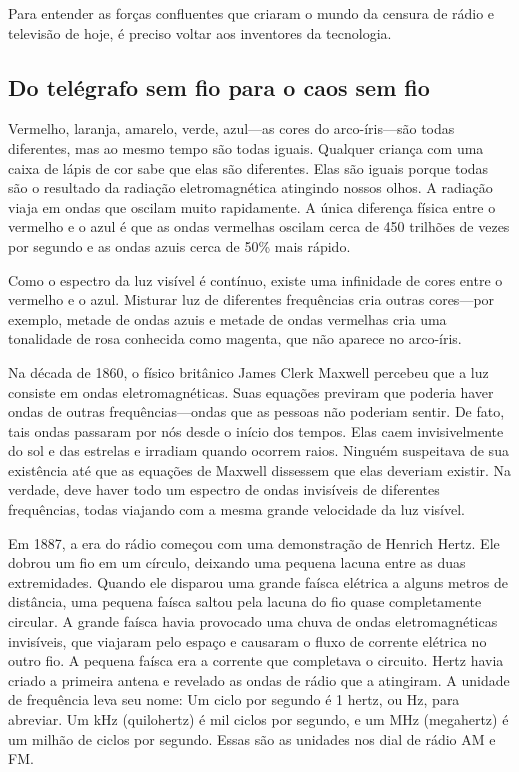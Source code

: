 \documentclass{book}
\begin{document}
Para entender as forças confluentes que criaram o mundo da censura de rádio e
televisão de hoje, é preciso voltar aos inventores da tecnologia.

\subsection{Do telégrafo sem fio para o caos sem fio}
\label{cap8:os-como-do}
Vermelho, laranja, amarelo, verde, azul---as cores do arco-íris---são todas
diferentes, mas ao mesmo tempo são todas iguais. Qualquer criança com uma caixa
de lápis de cor sabe que elas são diferentes. Elas são iguais porque todas são o
resultado da radiação eletromagnética atingindo nossos olhos. A radiação viaja em
ondas que oscilam muito rapidamente. A única diferença física entre o vermelho e
o azul é que as ondas vermelhas oscilam cerca de 450 trilhões de vezes por segundo
e as ondas azuis cerca de 50\% mais rápido.

Como o espectro da luz visível é contínuo, existe uma infinidade de cores entre
o vermelho e o azul. Misturar luz de diferentes frequências cria outras cores---por
exemplo, metade de ondas azuis e metade de ondas vermelhas cria uma tonalidade de
rosa conhecida como magenta, que não aparece no arco-íris.

Na década de 1860, o físico britânico James Clerk Maxwell percebeu que a luz
consiste em ondas eletromagnéticas. Suas equações previram que poderia haver
ondas de outras frequências---ondas que as pessoas não poderiam sentir. De fato,
tais ondas passaram por nós desde o início dos tempos. Elas caem invisivelmente
do sol e das estrelas e irradiam quando ocorrem raios. Ninguém suspeitava de sua
existência até que as equações de Maxwell dissessem que elas deveriam existir. Na
verdade, deve haver todo um espectro de ondas invisíveis de diferentes frequências,
todas viajando com a mesma grande velocidade da luz visível.

Em 1887, a era do rádio começou com uma demonstração de Henrich Hertz. Ele dobrou
um fio em um círculo, deixando uma pequena lacuna entre as duas extremidades.
Quando ele disparou uma grande faísca elétrica a alguns metros de distância, uma
pequena faísca saltou pela lacuna do fio quase completamente circular. A grande
faísca havia provocado uma chuva de ondas eletromagnéticas invisíveis, que
viajaram pelo espaço e causaram o fluxo de corrente elétrica no outro fio. A
pequena faísca era a corrente que completava o circuito. Hertz havia criado a
primeira antena e revelado as ondas de rádio que a atingiram. A unidade de
frequência leva seu nome: Um ciclo por segundo é 1 hertz, ou Hz, para abreviar.
Um kHz (quilohertz) é mil ciclos por segundo, e um MHz (megahertz) é um milhão de
ciclos por segundo. Essas são as unidades nos dial de rádio AM e FM.
\end{document}
